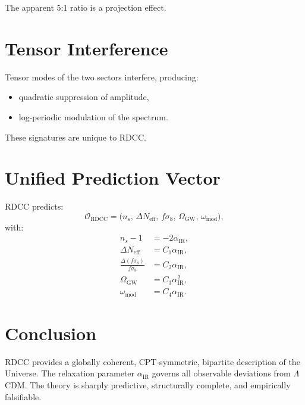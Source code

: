\documentclass[11pt,a4paper]{article}
\begin{document}
The apparent 5:1 ratio is a projection effect.

\section{Tensor Interference}

Tensor modes of the two sectors interfere, producing:
\begin{itemize}[leftmargin=0.8cm]
  \item quadratic suppression of amplitude,
  \item log-periodic modulation of the spectrum.
\end{itemize}

These signatures are unique to RDCC.

\section{Unified Prediction Vector}

RDCC predicts:
\begin{equation}
\mathcal{O}_{\mathrm{RDCC}}
=
\bigl(
n_s,\,
\Delta N_{\mathrm{eff}},\,
f\sigma_8,\,
\Omega_{\mathrm{GW}},\,
\omega_{\mathrm{mod}}
\bigr),
\end{equation}
with:
\begin{align}
n_s - 1 &= -2\alpha_{\mathrm{IR}}, \\
\Delta N_{\mathrm{eff}} &= C_1\alpha_{\mathrm{IR}}, \\
\frac{\Delta(f\sigma_8)}{f\sigma_8} &= C_2\alpha_{\mathrm{IR}}, \\
\Omega_{\mathrm{GW}} &= C_3\alpha_{\mathrm{IR}}^2, \\
\omega_{\mathrm{mod}} &= C_4\alpha_{\mathrm{IR}}.
\end{align}

\section{Conclusion}

RDCC provides a globally coherent, CPT-symmetric, bipartite description of the
Universe. The relaxation parameter $\alpha_{\mathrm{IR}}$ governs all observable
deviations from $\Lambda$CDM. The theory is sharply predictive, structurally
complete, and empirically falsifiable.
\end{document}
